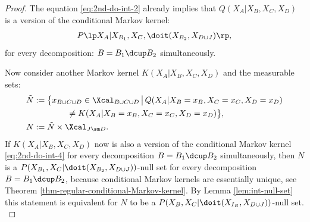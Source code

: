 \begin{Cor}[Do-calculus]
\begin{proof}
The equation \ref{eq:2nd-do-int-2} already implies that $Q(X_A|X_B,X_C,X_D)$ is a version of the conditional Markov kernel:
\begin{align} P\lp X_A|X_{B_1},X_C,\doit(X_{B_2},X_{D\cup J})\rp, \label{eq:2nd-do-int-4} 
\end{align}
for every decomposition: $B=B_1 \dcup B_2$ simultaneously.

Now consider another Markov kernel $K(X_A|X_B,X_C,X_D)$ and the measurable sets:
\begin{align*}
    \tilde N &:= \bigl\{ x_{B \cup C \cup D} \in \Xcal_{B \cup C \cup D} \,\big|\,  Q(X_A|X_B=x_B,X_C=x_C,X_D=x_D) \\ 
    & \qquad \qquad  \neq K(X_A|X_B=x_B,X_C=x_C,X_D=x_D)  \bigr\},\\
  N &:= \tilde N \times \Xcal_{J \sm D}.
\end{align*}
If $K(X_A|X_B,X_C,X_D)$ now is also a version of the conditional Markov kernel \ref{eq:2nd-do-int-4} 
for every decomposition $B=B_1 \dcup B_2$ simultaneously, then $N$ is a 
$P(X_{B_1},X_C|\doit(X_{B_2},X_{D\cup J}))$-null set for every decomposition $B=B_1 \dcup B_2$, 
because conditional Markov kernels are essentially unique, see Theorem \ref{thm-regular-conditional-Markov-kernel}. 
By Lemma \ref{lem:int-null-set} this statement is equivalent for $N$ to be a 
$P(X_B,X_C|\doit(X_{I_B},X_{D\cup J}))$-null set.\\



\end{proof}
\end{Cor}
